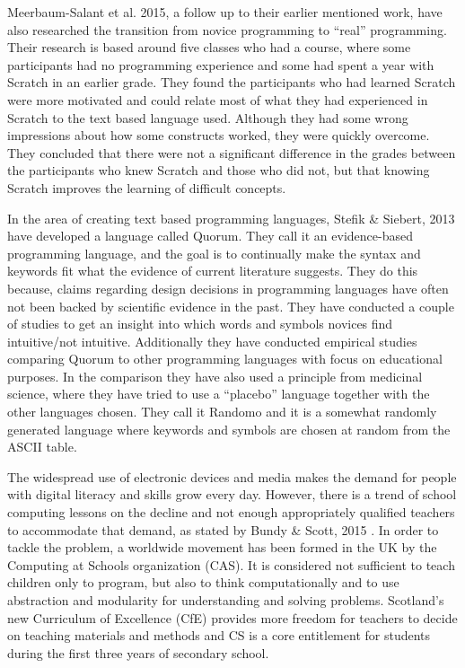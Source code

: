 Meerbaum-Salant et al. 2015\cite{from_scratch_to_real}, a follow up to their earlier mentioned work, have also researched the transition from novice programming to ``real'' programming. Their research is based around five classes who had a course, where some participants had no programming experience and some had spent a year with Scratch in an earlier grade. They found the participants who had learned Scratch were more motivated and could relate most of what they had experienced in Scratch to the text based language used. Although they had some wrong impressions about how some constructs worked, they were quickly overcome. They concluded that there were not a significant difference in the grades between the participants who knew Scratch and those who did not, but that knowing Scratch improves the learning of difficult concepts.

In the area of creating text based programming languages, Stefik \& Siebert, 2013\cite{stefik_all_studies} have developed a language called Quorum. They call it an evidence-based programming language, and the goal is to continually make the syntax and keywords fit what the evidence of current literature suggests. They do this because, claims regarding design decisions in programming languages have often not been backed by scientific evidence in the past\cite{ShaneMarkstrum10}. They have conducted a couple of studies to get an insight into which words and symbols novices find intuitive/not intuitive. Additionally they have conducted empirical studies comparing Quorum to other programming languages with focus on educational purposes. In the comparison they have also used a principle from medicinal science, where they have tried to use a ``placebo'' language together with the other languages chosen. They call it Randomo and it is a somewhat randomly generated language where keywords and symbols are chosen at random from the ASCII table.

The widespread use of electronic devices and media makes the demand for people with digital literacy and skills grow every day. However, there is a trend of school computing lessons on the decline and not enough appropriately qualified teachers to accommodate that demand, as stated by Bundy \& Scott, 2015 \cite{CompThinking}.
In order to tackle the problem, a worldwide movement has been formed in the UK by the Computing at Schools organization (CAS)\cite{CAS}.  It is considered not sufficient to teach children only to program, but also to think computationally and to use abstraction and modularity for understanding and solving problems. Scotland's new Curriculum of Excellence (CfE) provides more freedom for teachers to decide on teaching materials and methods and CS is a core entitlement for  students during the first three years of secondary school.

